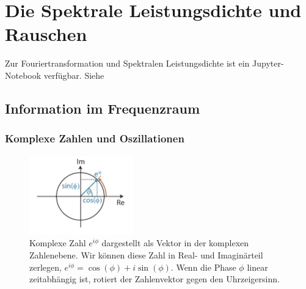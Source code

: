 \chapter{Die Spektrale Leistungsdichte und Rauschen} \label{ch:spectral}
\begin{center}
\begin{tcolorbox}[enhanced,width=6in,center upper,
    fontupper=\large,drop fuzzy shadow southwest,
    colframe=blue!50!black,colback=blue!10]
Zur Fouriertransformation und Spektralen Leistungsdichte ist ein Jupyter-Notebook verfügbar. Siehe  
\end{tcolorbox}
\end{center}

\section{Information im Frequenzraum}\label{sec:Fourier}
\subsection{Komplexe Zahlen und Oszillationen}
\label{subsec:vl7a}
\begin{figure}[tbp]
    \centering
        \includegraphics[width=0.4\textwidth]{Figures/complex_numbers.pdf}
        \caption{Komplexe Zahl $e^{i\phi}$ dargestellt als Vektor in der komplexen Zahlenebene. Wir können diese Zahl in Real- und Imaginärteil zerlegen, $e^{i\phi} = \cos{(\phi)} + i \sin{(\phi)}$. Wenn die Phase $\phi$ linear zeitabhängig ist, rotiert der Zahlenvektor gegen den Uhrzeigersinn.  }
        \label{fig:complexNumbers}
\end{figure}

